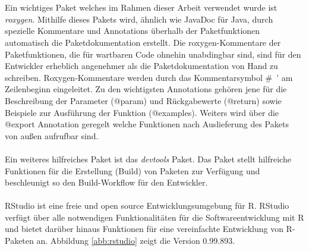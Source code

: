 \\
\\
Ein wichtiges Paket welches im Rahmen dieser Arbeit verwendet wurde ist \emph{roxygen}. Mithilfe dieses Pakets wird, ähnlich wie JavaDoc für Java, durch spezielle Kommentare und Annotations überhalb der Paketfunktionen automatisch die Paketdokumentation erstellt. Die roxygen-Kommentare der Paketfunktionen, die für wartbaren Code ohnehin unabdingbar sind, sind für den Entwickler erheblich angenehmer als die Paketdokumentation von Hand zu schreiben. Roxygen-Kommentare werden durch das Kommentarsymbol \mbox{\# '} am Zeilenbeginn eingeleitet. Zu den wichtigsten Annotations gehören jene für die Beschreibung der Parameter (@param) und Rückgabewerte (@return) sowie Beispiele zur Ausführung der Funktion (@examples). Weiters wird über die @export Annotation geregelt welche Funktionen nach Auslieferung des Pakets von außen aufrufbar sind.
\\
\\
Ein weiteres hilfreiches Paket ist das \emph{devtools} Paket. Das Paket stellt hilfreiche Funktionen für die Erstellung (Build) von Paketen zur Verfügung und beschleunigt so den Build-Workflow für den Entwickler.
\\
\\
RStudio ist eine freie und open source Entwicklungsumgebung für R. RStudio verfügt über alle notwendigen Funktionalitäten für die Softwareentwicklung mit R und bietet darüber hinaus Funktionen für eine vereinfachte Entwicklung von R-Paketen an. Abbildung \ref{abb:rstudio} zeigt die Version 0.99.893. 
